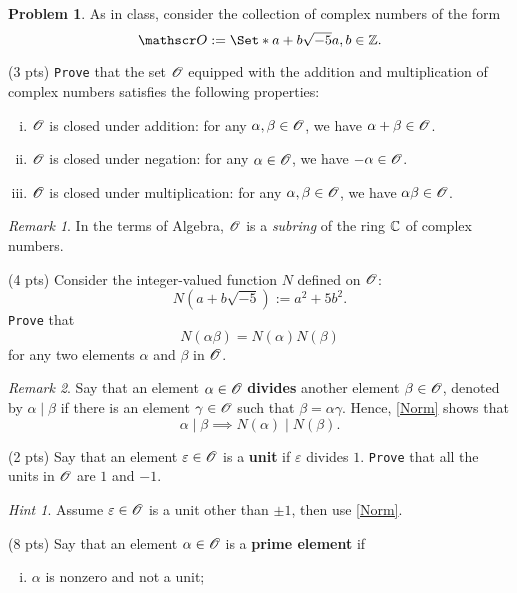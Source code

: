 \documentclass[11pt]{article}
\theoremstyle{plain}
\theoremstyle{definition}
\newtheorem{problem}{Problem}
\theoremstyle{remark}
\newtheorem*{remark}{Remark}
\newtheorem*{hint}{Hint}
\numberwithin{equation}{problem}
\providecommand\given{}
\begin{document}
\begin{problem}\label{p4}
	As in class, consider the collection of complex numbers of the form
	\[
		\scrO := \Set*{	a+b\sqrt{-5}	\given	a,b\in\Z	}.
	\]
	\begin{listinprob}
		\item (3 pts) \texttt{Prove} that the set $\mathscr{O}$ equipped with the addition and multiplication of complex numbers satisfies the following properties:
		\begin{enumerate}[(i)]
			\item $\mathscr{O}$ is closed under addition: for any $\alpha,\beta\in\mathscr{O}$, we have $\alpha+\beta\in\mathscr{O}$.
			\item $\mathscr{O}$ is closed under negation: for any $\alpha\in\mathscr{O}$, we have $-\alpha\in\mathscr{O}$.
			\item $\mathscr{O}$ is closed under multiplication: for any $\alpha,\beta\in\mathscr{O}$, we have $\alpha\beta\in\mathscr{O}$.
		\end{enumerate}
		\begin{remark}
			In the terms of Algebra, $\mathscr{O}$ is a \emph{subring} of the ring $\mathbb{C}$ of complex numbers.
		\end{remark}
		\item\label{Norm} (4 pts) Consider the integer-valued function $N$ defined on $\mathscr{O}$: 
		\[
			N(a+b\sqrt{-5}) := a^2+5b^2.
		\]
		\texttt{Prove} that 
		\[
			N(\alpha\beta) = N(\alpha)N(\beta)
		\]
		for any two elements $\alpha$ and $\beta$ in $\mathscr{O}$.
		\begin{remark}
			Say that an element $\alpha\in\mathscr{O}$ \textbf{divides} another element $\beta\in\mathscr{O}$, denoted by $\alpha\mid\beta$ if there is an element $\gamma\in\mathscr{O}$ such that $\beta=\alpha\gamma$. Hence, \cref{Norm} shows that 
			\[
				\alpha \mid \beta \implies N(\alpha) \mid N(\beta).
			\]
		\end{remark}
		\item\label{unit} (2 pts) Say that an element $\varepsilon\in\mathscr{O}$ is a \textbf{unit} if $\varepsilon$ divides $1$. 
		\texttt{Prove} that all the units in $\mathscr{O}$ are $1$ and $-1$.
		\begin{hint}
			Assume $\varepsilon\in\mathscr{O}$ is a unit other than $\pm 1$, then use \cref{Norm}.
		\end{hint}
		\item (8 pts) Say that an element $\alpha\in\mathscr{O}$ is a \textbf{prime element} if 
		\begin{enumerate}[(i)]
			\item $\alpha$ is nonzero and not a unit;

\end{enumerate}
\end{listinprob}
\end{problem}
\end{document}
